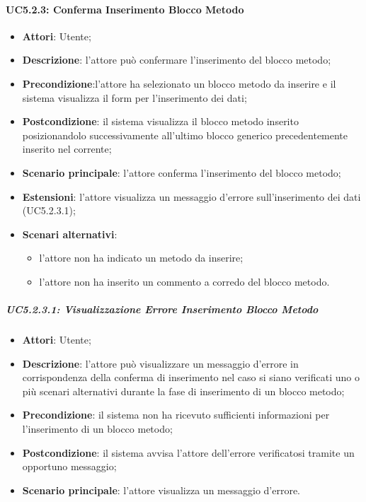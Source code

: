 \paragraph{UC5.2.3: Conferma Inserimento Blocco Metodo}
\label{UC5.2.3}
\begin{itemize}
\item \textbf{Attori}: Utente;
\item \textbf{Descrizione}: l'attore può confermare l'inserimento del blocco metodo;	
\item \textbf{Precondizione}:l'attore ha selezionato un blocco metodo da inserire e il sistema visualizza il form per l'inserimento dei dati;	
\item \textbf{Postcondizione}: il sistema visualizza il blocco metodo inserito posizionandolo successivamente all'ultimo blocco generico precedentemente inserito nel  corrente;		
\item \textbf{Scenario principale}:
l'attore conferma l'inserimento del blocco metodo;	
\item \textbf{Estensioni}:
l'attore visualizza un messaggio d'errore sull'inserimento dei dati (UC5.2.3.1);	
\item \textbf{Scenari alternativi}:
\begin{itemize}
\item l'attore non ha indicato un metodo da inserire;
\item l'attore non ha inserito un commento a corredo del blocco metodo.
\end{itemize}
\end{itemize}

\subparagraph{UC5.2.3.1: Visualizzazione Errore Inserimento Blocco Metodo}
\label{UC5.2.3.1}
\begin{itemize}
\item \textbf{Attori}: Utente;
\item \textbf{Descrizione}: l'attore può visualizzare un messaggio d'errore in corrispondenza della conferma di inserimento nel caso si siano verificati uno o più scenari alternativi durante la fase di inserimento di un blocco metodo;	
\item \textbf{Precondizione}: il sistema non ha ricevuto sufficienti informazioni per l'inserimento di un blocco metodo;	
\item \textbf{Postcondizione}: il sistema avvisa l'attore dell'errore verificatosi tramite un opportuno messaggio;	
\item \textbf{Scenario principale}:
l'attore visualizza un messaggio d'errore.	
\end{itemize}

